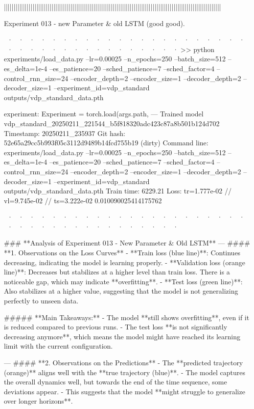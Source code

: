 ||||||||||||||||||||||||||||||||||||||||||||||||||||||||||||||||||||||||||||||||||||||||||||||||||||||||||||||||||


Experiment 013 - new Parameter & old LSTM (good good). 


~· ~· ~· ~· ~· ~· ~· ~· ~· ~· ~· ~· ~· ~· ~· ~· ~· ~· ~· ~· ~· ~· ~· ~· ~· ~· ~· ~· ~· ~· ~· ~· ~· ~· ~· ~· ~· ~· 
>> python experiments/load_data.py --lr=0.00025 --n_epochs=250 --batch_size=512 --es_delta=1e-4 --es_patience=20 --sched_patience=7 --sched_factor=4 --control_rnn_size=24 --encoder_depth=2 --encoder_size=1 --decoder_depth=2 --decoder_size=1 --experiment_id=vdp_standard outputs/vdp_standard_data.pth

experiment: Experiment = torch.load(args.path,
--- Trained model   vdp_standard_20250211_221544_b5f818320adc423c87a8b501b124d702
Timestamp:      20250211_235937
Git hash:       52e65a29cc5b993f05c3112d9489b14fcd755b19 (dirty)
Command line:   experiments/load_data.py --lr=0.00025 --n_epochs=250 --batch_size=512 --es_delta=1e-4 --es_patience=20 --sched_patience=7 --sched_factor=4 --control_rnn_size=24 --encoder_depth=2 --encoder_size=1 --decoder_depth=2 --decoder_size=1 --experiment_id=vdp_standard outputs/vdp_standard_data.pth
Train time:     6229.21
Loss:           tr=1.777e-02 // vl=9.745e-02 // ts=3.222e-02
0.010090025414175762

~· ~· ~· ~· ~· ~· ~· ~· ~· ~· ~· ~· ~· ~· ~· ~· ~· ~· ~· ~· ~· ~· ~· ~· ~· ~· ~· ~· ~· ~· ~· ~· ~· ~· ~· ~· ~· ~· 

### **Analysis of Experiment 013 - New Parameter & Old LSTM**
---
#### **1. Observations on the Loss Curves**
- **Train loss (blue line)**: Continues decreasing, indicating the model is learning properly.
- **Validation loss (orange line)**: Decreases but stabilizes at a higher level than train loss. There is a noticeable gap, which may indicate **overfitting**.
- **Test loss (green line)**: Also stabilizes at a higher value, suggesting that the model is not generalizing perfectly to unseen data.

##### **Main Takeaways:**
- The model **still shows overfitting**, even if it is reduced compared to previous runs.
- The test loss **is not significantly decreasing anymore**, which means the model might have reached its learning limit with the current configuration.

---
#### **2. Observations on the Predictions**
- The **predicted trajectory (orange)** aligns well with the **true trajectory (blue)**.
- The model captures the overall dynamics well, but towards the end of the time sequence, some deviations appear.
- This suggests that the model **might struggle to generalize over longer horizons**.

